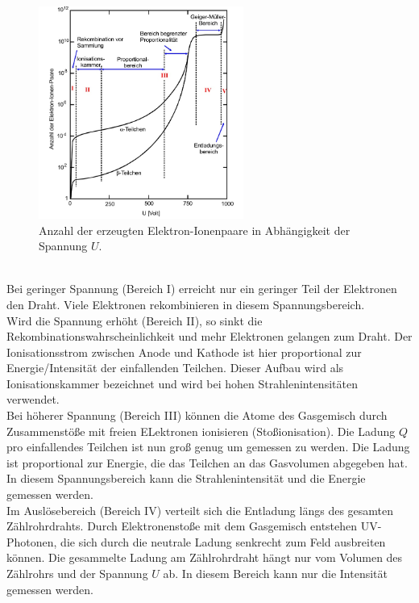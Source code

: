 \begin{figure}
    \centering
    \includegraphics[width=0.6\textwidth]{content/data/spannung.jpg}
    \caption{Anzahl der erzeugten Elektron-Ionenpaare in Abhängigkeit der Spannung $U$. \cite[2]{anleitung}}
    \label{fig:spannung}
\end{figure}
\\
Bei geringer Spannung (Bereich I) erreicht nur ein geringer Teil der Elektronen den Draht.
Viele Elektronen rekombinieren in diesem Spannungsbereich.
\\
Wird die Spannung erhöht (Bereich II), so sinkt die Rekombinationswahrscheinlichkeit und mehr Elektronen gelangen zum Draht.
Der Ionisationsstrom zwischen Anode und Kathode ist hier proportional zur Energie/Intensität der einfallenden Teilchen.
Dieser Aufbau wird als Ionisationskammer bezeichnet und wird bei hohen Strahlenintensitäten verwendet.
\\
Bei höherer Spannung (Bereich III) können die Atome des Gasgemisch durch Zusammenstöße mit freien ELektronen ionisieren (Stoßionisation).
Die Ladung $Q$ pro einfallendes Teilchen ist nun groß genug um gemessen zu werden.
Die Ladung ist proportional zur Energie, die das Teilchen an das Gasvolumen abgegeben hat.
In diesem Spannungsbereich kann die Strahlenintensität und die Energie gemessen werden.
\\
Im Auslösebereich (Bereich IV) verteilt sich die Entladung längs des gesamten Zählrohrdrahts.
Durch Elektronenstoße mit dem Gasgemisch entstehen UV-Photonen, die sich durch die neutrale Ladung senkrecht zum Feld ausbreiten können.
Die gesammelte Ladung am Zählrohrdraht hängt nur vom Volumen des Zählrohrs und der Spannung $U$ ab.
In diesem Bereich kann nur die Intensität gemessen werden.

